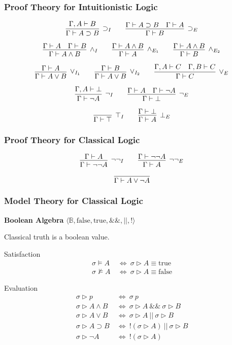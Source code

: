\documentclass[mathserif]{beamer}
\def\true{\textrm{true}}
\def\false{\textrm{false}}
\def\imp{\supset}
\def\dfn{~\Leftrightarrow~}
\newcommand{\turn}[1]{\Gamma \vdash #1}
\newcommand{\cturn}[2]{\Gamma , #1 \vdash #2}
\newcommand{\eval}[1]{\sigma \triangleright #1}
\newcommand{\sat}[1]{\sigma \vDash #1}
\newcommand{\nsat}[1]{\sigma \nvDash #1}
\begin{document}
\begin{frame}
\frametitle{Proof Theory for Intuitionistic Logic}

$$
\infer
  [\imp_I]
  {\turn{A \imp B}}
{
  {\cturn{A}{B}}
}
\qquad
\infer
  [\imp_E]
  {\turn{B}}
{
  {\turn{A \imp B}}
  &
  {\turn{A}}
}
$$

$$
\infer
  [\land_I]
  {\turn{A \land B}}
{
  {\turn{A}}
  &
  {\turn{B}}
}
\qquad
\infer
  [\land_{E_1}]
  {\turn{A}}
{
  {\turn{A \land B}}
}
\qquad
\infer
  [\land_{E_2}]
  {\turn{B}}
{
  {\turn{A \land B}}
}
$$

$$
\infer
  [\lor_{I_1}]
  {\turn{A \lor B}}
{
  {\turn{A}}
}
\qquad
\infer
  [\lor_{I_2}]
  {\turn{A \lor B}}
{
  {\turn{B}}
}
\qquad
\infer
  [\lor_E]
  {\turn{C}}
{
  {\cturn{A}{C}}
  &
  {\cturn{B}{C}}
}
$$

$$
\infer
  [\neg_I]
  {\turn{\neg A}}
{
  {\cturn{A}{\bot}}
}
\qquad
\infer
  [\neg_E]
  {\turn{\bot}}
{
  {\turn{A}}
  &
  {\turn{\neg A}}
}
$$

$$
\infer
  [\top_I]
  {\turn{\top}}
{
}
\qquad
\infer
  [\bot_E]
  {\turn{A}}
{
  {\turn{\bot}}
}
$$

\end{frame}

\begin{frame}
\frametitle{Proof Theory for Classical Logic}


$$
\infer
  [\neg\neg_I]
  {\turn{\neg\neg A}}
{
  {\turn{A}}
}
\qquad
\infer
  [\neg\neg_E]
  {\turn{A}}
{
  {\turn{\neg\neg A}}
}
$$


$$
\infer{\turn{A \lor \neg A}}
{}
$$

\end{frame}

\begin{frame}
\frametitle{Model Theory for Classical Logic}

{\bf Boolean Algebra} $\langle \mathbb{B} , \false , \true , \&\& , || , ! \rangle$

Classical truth is a boolean value.

\begin{block}{Satisfaction}
\begin{align*}
\sat{A} &\dfn \eval{A} \equiv \true\\
\nsat{A} &\dfn \eval{A} \equiv \false
\end{align*}
\end{block}

\begin{block}{Evaluation}
\begin{align*}
\eval{p} &\dfn \sigma ~ p\\
\eval{A \land B} &\dfn \eval{A} ~\&\&~ \eval{B}\\
\eval{A \lor B} &\dfn \eval{A} ~||~ \eval{B}\\
\eval{A \imp B} &\dfn ! (\eval{A}) ~||~ \eval{B}\\
\eval{\neg A} &\dfn ! (\eval{A})
\end{align*}
\end{block}

\end{frame}
\end{document}
